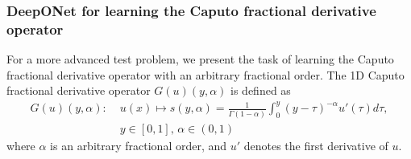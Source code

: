 \documentclass{article}
\begin{document}
\begin{table}[h!]
    \centering
    \caption{Relative $L_2$ errors for DeepONet models on test datasets generated from GRF with different length scales. DeepSeek R1, with its diverse training data and error-free implementation, achieves the best results. Claude models used advanced dropout techniques, regularization, learning rate scheduling, and Swish activation, but without these, the models would have performed better and been comparable to ChatGPT's results.}
    \vspace{2mm}
    \renewcommand{\arraystretch}{1.5}
    \label{tab:Antiderivative testing}
\end{table}

\subsubsection{DeepONet for learning the Caputo fractional derivative operator}

For a more advanced test problem, we present the task of learning the Caputo fractional derivative operator with an arbitrary fractional order. The 1D Caputo fractional derivative operator $G(u)(y,\alpha)$ is defined as 
\begin{align*}
    G(u)(y,\alpha) : \;& u(x) \mapsto s(y,\alpha) = \frac{1}{\Gamma(1-\alpha)} \int_{0}^{y} (y-\tau)^{-\alpha} u'(\tau) d\tau, \\
    & y \in [0,1], \, \alpha \in (0,1)
\end{align*}
where $\alpha$ is an arbitrary fractional order, and $u'$ denotes the first derivative of $u$. 
\end{document}

